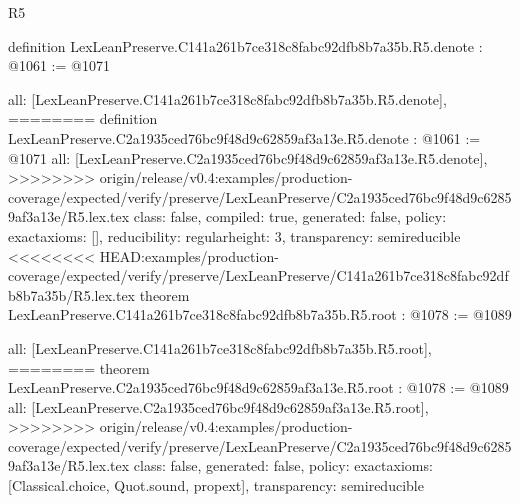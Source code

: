 \begin{lexlean}{R5}
\begin{coremodule}
{{{{{{{definition LexLeanPreserve.C141a261b7ce318c8fabc92dfb8b7a35b.R5.denote : @1061 := @1071 {
  all: [LexLeanPreserve.C141a261b7ce318c8fabc92dfb8b7a35b.R5.denote],
========
definition LexLeanPreserve.C2a1935ced76bc9f48d9c62859af3a13e.R5.denote : @1061 := @1071 {
  all: [LexLeanPreserve.C2a1935ced76bc9f48d9c62859af3a13e.R5.denote],
>>>>>>>> origin/release/v0.4:examples/production-coverage/expected/verify/preserve/LexLeanPreserve/C2a1935ced76bc9f48d9c62859af3a13e/R5.lex.tex
  class: false,
  compiled: true,
  generated: false,
  policy: exact{axioms: []},
  reducibility: regular{height: 3},
  transparency: semireducible
}
<<<<<<<< HEAD:examples/production-coverage/expected/verify/preserve/LexLeanPreserve/C141a261b7ce318c8fabc92dfb8b7a35b/R5.lex.tex
theorem LexLeanPreserve.C141a261b7ce318c8fabc92dfb8b7a35b.R5.root : @1078 := @1089 {
  all: [LexLeanPreserve.C141a261b7ce318c8fabc92dfb8b7a35b.R5.root],
========
theorem LexLeanPreserve.C2a1935ced76bc9f48d9c62859af3a13e.R5.root : @1078 := @1089 {
  all: [LexLeanPreserve.C2a1935ced76bc9f48d9c62859af3a13e.R5.root],
>>>>>>>> origin/release/v0.4:examples/production-coverage/expected/verify/preserve/LexLeanPreserve/C2a1935ced76bc9f48d9c62859af3a13e/R5.lex.tex
  class: false,
  generated: false,
  policy: exact{axioms: [Classical.choice, Quot.sound, propext]},
  transparency: semireducible
}

}}}}}}}}}
\end{coremodule}
\end{lexlean}
